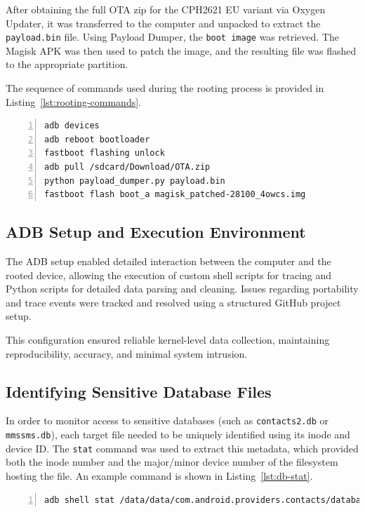 \documentclass[a4paper,12pt]{report}
\begin{document}
After obtaining the full OTA zip for the CPH2621 EU variant via Oxygen Updater, it was transferred to the computer and unpacked to extract the \texttt{payload.bin} file. Using Payload Dumper, the \texttt{boot image} was retrieved. The Magisk APK was then used to patch the image, and the resulting file was flashed to the appropriate partition.

The sequence of commands used during the rooting process is provided in Listing~\ref{lst:rooting-commands}.

\begin{lstlisting}[caption={Command Sequence for Rooting Procedure},label={lst:rooting-commands},numbers=left]
adb devices
adb reboot bootloader
fastboot flashing unlock
adb pull /sdcard/Download/OTA.zip
python payload_dumper.py payload.bin
fastboot flash boot_a magisk_patched-28100_4owcs.img
\end{lstlisting}

\subsection{ADB Setup and Execution Environment}

The ADB setup enabled detailed interaction between the computer and the rooted device, allowing the execution of custom shell scripts for tracing and Python scripts for detailed data parsing and cleaning. Issues regarding portability and trace events were tracked and resolved using a structured GitHub project setup.

This configuration ensured reliable kernel-level data collection, maintaining reproducibility, accuracy, and minimal system intrusion.

\subsection{Identifying Sensitive Database Files}

In order to monitor access to sensitive databases (such as \texttt{contacts2.db} or \texttt{mmssms.db}), each target file needed to be uniquely identified using its inode and device ID. The \texttt{stat} command was used to extract this metadata, which provided both the inode number and the major/minor device number of the filesystem hosting the file. An example command is shown in Listing~\ref{lst:db-stat}.

\begin{lstlisting}[caption={Retrieving inode and device ID for a database file},label={lst:db-stat},numbers=left]
adb shell stat /data/data/com.android.providers.contacts/databases/contacts2.db
\end{lstlisting}
\end{document}
